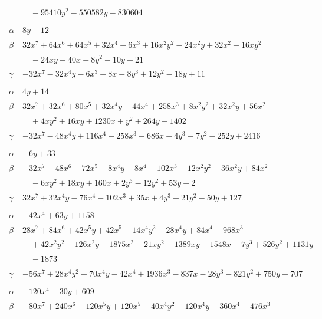 \documentclass[11pt]{article}
\begin{document}
\begin{longtable}{@{}ll@{}}
 & $\quad -95410y^{2}-550582y-830604$\\
\addlinespace[3pt]
\multicolumn{2}{@{}l}{$\{i,j\}=\{71,75\}$, $k_{ij}=2^{2}\cdot 5$}\\
$\alpha$ & $8y-12$\\
$\beta$ & $32x^{7}+64x^{6}+64x^{5}+32x^{4}+6x^{3}+16x^{2}y^{2}-24x^{2}y+32x^{2}+16xy^{2}$\\
 & $\quad -24xy+40x+8y^{2}-10y+21$\\
$\gamma$ & $-32x^{7}-32x^{4}y-6x^{3}-8x-8y^{3}+12y^{2}-18y+11$\\
\addlinespace[3pt]
\multicolumn{2}{@{}l}{$\{i,j\}=\{72,74\}$, $k_{ij}=2\cdot 3^{2}\cdot 5^{2}\cdot 17$}\\
$\alpha$ & $4y+14$\\
$\beta$ & $32x^{7}+32x^{6}+80x^{5}+32x^{4}y-44x^{4}+258x^{3}+8x^{2}y^{2}+32x^{2}y+56x^{2}$\\
 & $\quad +4xy^{2}+16xy+1230x+y^{2}+264y-1402$\\
$\gamma$ & $-32x^{7}-48x^{4}y+116x^{4}-258x^{3}-686x-4y^{3}-7y^{2}-252y+2416$\\
\addlinespace[3pt]
\multicolumn{2}{@{}l}{$\{i,j\}=\{72,75\}$, $k_{ij}=2^{2}\cdot 3\cdot 13$}\\
$\alpha$ & $-6y+33$\\
$\beta$ & $-32x^{7}-48x^{6}-72x^{5}-8x^{4}y-8x^{4}+102x^{3}-12x^{2}y^{2}+36x^{2}y+84x^{2}$\\
 & $\quad -6xy^{2}+18xy+160x+2y^{3}-12y^{2}+53y+2$\\
$\gamma$ & $32x^{7}+32x^{4}y-76x^{4}-102x^{3}+35x+4y^{3}-21y^{2}-50y+127$\\
\addlinespace[3pt]
\multicolumn{2}{@{}l}{$\{i,j\}=\{73,102\}$, $k_{ij}=2\cdot 3^{5}\cdot 13$}\\
$\alpha$ & $-42x^{4}+63y+1158$\\
$\beta$ & $28x^{7}+84x^{6}+42x^{5}y+42x^{5}-14x^{4}y^{2}-28x^{4}y+84x^{4}-968x^{3}$\\
 & $\quad +42x^{2}y^{2}-126x^{2}y-1875x^{2}-21xy^{2}-1389xy-1548x-7y^{3}+526y^{2}+1131y$\\
 & $\quad -1873$\\
$\gamma$ & $-56x^{7}+28x^{4}y^{2}-70x^{4}y-42x^{4}+1936x^{3}-837x-28y^{3}-821y^{2}+750y+707$\\
\addlinespace[3pt]
\multicolumn{2}{@{}l}{$\{i,j\}=\{74,108\}$, $k_{ij}=3^{7}$}\\
$\alpha$ & $-120x^{4}-30y+609$\\
$\beta$ & $-80x^{7}+240x^{6}-120x^{5}y+120x^{5}-40x^{4}y^{2}-120x^{4}y-360x^{4}+476x^{3}$\\

\end{longtable}
\end{document}
